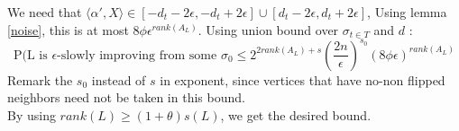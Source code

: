 We need that $ \langle\alpha ', X \rangle \in [- d_t -2\epsilon, -d_t + 2\epsilon] \cup [d_t - 2\epsilon, d_t + 2\epsilon]$, Using lemma \ref{noise}, this is at most $8\phi\epsilon^{rank(A_L)}$. Using union bound over $\sigma_{t \in T}$ and $d$ :
\begin{equation*}
\text{P(L is }\epsilon\text{-slowly improving from some }\sigma_0 \leq 2^{2rank(A_L) + s}(\frac{2n}{\epsilon})^{s_0}(8\phi\epsilon)^{rank(A_L)}
\end{equation*}
Remark the $s_0$ instead of $s$ in exponent, since vertices that have no-non flipped neighbors need not be taken in this bound. \\
By using  $rank(L) \geq (1+\theta)s(L)$, we get the desired bound. \\
